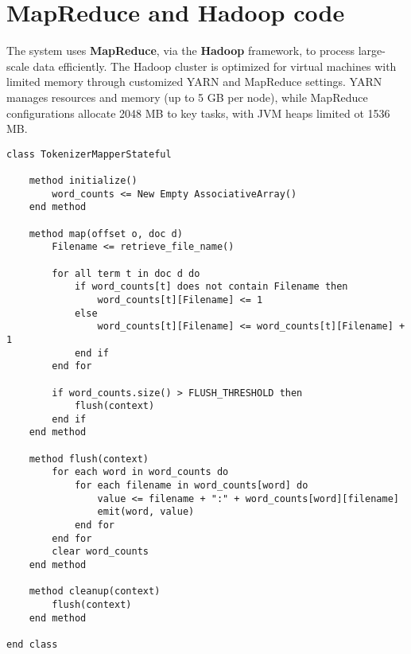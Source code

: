 \section{MapReduce and Hadoop code}
The system uses \textbf{MapReduce}, via the \textbf{Hadoop} framework, to process large-scale data efficiently. The Hadoop cluster is optimized for virtual machines with limited memory through customized YARN and MapReduce settings. YARN manages resources and memory (up to 5 GB per node), while MapReduce configurations allocate 2048 MB to key tasks, with JVM heaps limited ot 1536 MB.

\newpage 

\begin{center}
	\begin{minipage}{\linewidth}
		\begin{lstlisting}[language=PseudoCode]
class TokenizerMapperStateful

	method initialize()
		word_counts <= New Empty AssociativeArray()
	end method
	
	method map(offset o, doc d)
		Filename <= retrieve_file_name()
		
		for all term t in doc d do
			if word_counts[t] does not contain Filename then
				word_counts[t][Filename] <= 1
			else
				word_counts[t][Filename] <= word_counts[t][Filename] + 1
			end if
		end for
		
		if word_counts.size() > FLUSH_THRESHOLD then
			flush(context)
		end if
	end method
	
	method flush(context)
		for each word in word_counts do
			for each filename in word_counts[word] do
				value <= filename + ":" + word_counts[word][filename]
				emit(word, value)
			end for
		end for
		clear word_counts
	end method
	
	method cleanup(context)
		flush(context)
	end method

end class
		\end{lstlisting}
		\label{fig:pseudocode-stateful-mapper}
	\end{minipage}
\end{center}
